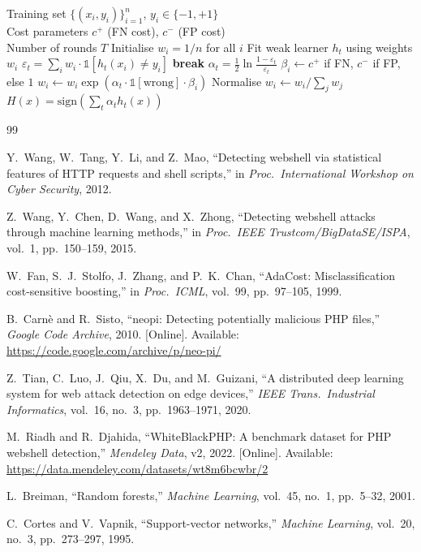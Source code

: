\documentclass[journal,twocolumn]{IEEEtran}
\begin{document}
\begin{algorithm}[H]
\caption{AdaCost (Fan et al., 1999)}
\label{alg:adacost}
\begin{algorithmic}[1]
\REQUIRE Training set $\{(x_i, y_i)\}_{i=1}^n$, $y_i \in \{-1, +1\}$\\
\REQUIRE Cost parameters $c^+$ (FN cost), $c^-$ (FP cost)\\
\REQUIRE Number of rounds $T$
\STATE Initialise $w_i = 1/n$ for all $i$
  \STATE Fit weak learner $h_t$ using weights $w_i$
  \STATE $\varepsilon_t = \sum_i w_i \cdot \mathbb{1}[h_t(x_i) \neq y_i]$
    \STATE \textbf{break}
  \ENDIF
  \STATE $\alpha_t = \frac{1}{2}\ln\frac{1 - \varepsilon_t}{\varepsilon_t}$
    \STATE $\beta_i \leftarrow c^+$ if FN, $c^-$ if FP, else $1$
    \STATE $w_i \leftarrow w_i \exp(\alpha_t \cdot \mathbb{1}[\text{wrong}] \cdot \beta_i)$
  \ENDFOR
  \STATE Normalise $w_i \leftarrow w_i / \sum_j w_j$
\ENDFOR
\RETURN $H(x) = \text{sign}\!\left(\sum_t \alpha_t h_t(x)\right)$
\end{algorithmic}
\end{algorithm}

\begin{thebibliography}{99}

Y.~Wang, W.~Tang, Y.~Li, and Z.~Mao,
``Detecting webshell via statistical features of HTTP requests and shell scripts,''
in \textit{Proc.\ International Workshop on Cyber Security},
2012.

Z.~Wang, Y.~Chen, D.~Wang, and X.~Zhong,
``Detecting webshell attacks through machine learning methods,''
in \textit{Proc.\ IEEE Trustcom/BigDataSE/ISPA}, vol.~1, pp.~150--159, 2015.

W.~Fan, S.~J.~Stolfo, J.~Zhang, and P.~K.~Chan,
``AdaCost: Misclassification cost-sensitive boosting,''
in \textit{Proc.\ ICML}, vol.~99, pp.~97--105, 1999.

B.~Carn\`{e} and R.~Sisto,
``neopi: Detecting potentially malicious PHP files,''
\textit{Google Code Archive},
2010.
[Online]. Available: \url{https://code.google.com/archive/p/neo-pi/}

Z.~Tian, C.~Luo, J.~Qiu, X.~Du, and M.~Guizani,
``A distributed deep learning system for web attack detection on edge devices,''
\textit{IEEE Trans.\ Industrial Informatics}, vol.~16, no.~3, pp.~1963--1971, 2020.

M.~Riadh and R.~Djahida,
``WhiteBlackPHP: A benchmark dataset for PHP webshell detection,''
\textit{Mendeley Data}, v2,
2022.
[Online]. Available: \url{https://data.mendeley.com/datasets/wt8m6bcwbr/2}

L.~Breiman,
``Random forests,''
\textit{Machine Learning}, vol.~45, no.~1, pp.~5--32, 2001.

C.~Cortes and V.~Vapnik,
``Support-vector networks,''
\textit{Machine Learning}, vol.~20, no.~3, pp.~273--297, 1995.

\end{thebibliography}
\end{document}

